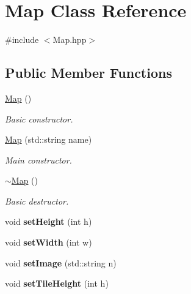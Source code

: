 \hypertarget{class_map}{\section{Map Class Reference}
\label{class_map}
}


{\ttfamily \#include $<$Map.\+hpp$>$}

\subsection*{Public Member Functions}
\begin{DoxyCompactItemize}
\item 
\hyperlink{class_map_a0f5ad0fd4563497b4214038cbca8b582}{Map} ()
\begin{DoxyCompactList}\small\item\em Basic constructor. \end{DoxyCompactList}\item 
\hyperlink{class_map_aeec3ac95150a6a9df4a417be707bcf9d}{Map} (std\+::string name)
\begin{DoxyCompactList}\small\item\em Main constructor. \end{DoxyCompactList}\item 
\hypertarget{class_map_aa403fbe09394ccf39747588f5168e3b2}{\hyperlink{class_map_aa403fbe09394ccf39747588f5168e3b2}{$\sim$\+Map} ()}\label{class_map_aa403fbe09394ccf39747588f5168e3b2}

\begin{DoxyCompactList}\small\item\em Basic destructor. \end{DoxyCompactList}\item 
\hypertarget{class_map_affab3537641a7985559f83ea083e00ca}{void {\bfseries set\+Height} (int h)}\label{class_map_affab3537641a7985559f83ea083e00ca}

\item 
\hypertarget{class_map_a2915ccde4d8a2ba8142677baea803467}{void {\bfseries set\+Width} (int w)}\label{class_map_a2915ccde4d8a2ba8142677baea803467}

\item 
\hypertarget{class_map_a7ac17b33fc7266fcc30b19c33c70c3ca}{void {\bfseries set\+Image} (std\+::string n)}\label{class_map_a7ac17b33fc7266fcc30b19c33c70c3ca}

\item 
\hypertarget{class_map_a7faf61ea4f43b4c1e15bd3d8744366b6}{void {\bfseries set\+Tile\+Height} (int h)}\label{class_map_a7faf61ea4f43b4c1e15bd3d8744366b6}


\end{DoxyCompactItemize}
